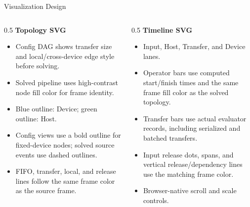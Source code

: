 \documentclass[aspectratio=169]{beamer}
\newcommand{\device}{\textsf{Device}}
\newcommand{\host}{\textsf{Host}}
\begin{document}
\begin{frame}{Visualization Design}
  \begin{columns}[T,onlytextwidth]
    \begin{column}{0.5\textwidth}
      \textbf{Topology SVG}
      \begin{itemize}
        \item Config DAG shows transfer size and local/cross-device edge style before solving.
        \item Solved pipeline uses high-contrast node fill color for frame identity.
        \item Blue outline: \device; green outline: \host.
        \item Config views use a bold outline for fixed-device nodes; solved source events use dashed outlines.
        \item FIFO, transfer, local, and release lines follow the same frame color as the source frame.
      \end{itemize}
    \end{column}
    \begin{column}{0.5\textwidth}
      \textbf{Timeline SVG}
      \begin{itemize}
        \item Input, Host, Transfer, and Device lanes.
        \item Operator bars use computed start/finish times and the same frame fill color as the solved topology.
        \item Transfer bars use actual evaluator records, including serialized and batched transfers.
        \item Input release dots, spans, and vertical release/dependency lines use the matching frame color.
        \item Browser-native scroll and scale controls.
      \end{itemize}
    \end{column}
  \end{columns}
\end{frame}
\end{document}
